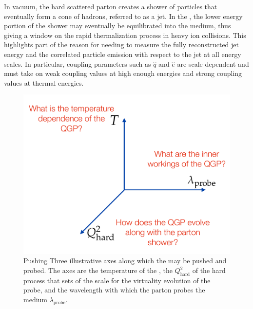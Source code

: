 
In vacuum, the hard scattered parton creates a shower of particles
that eventually form a cone of hadrons, referred to as a jet.  In the
\qgp, the lower energy portion of the shower may eventually be
equilibrated into the medium, thus giving a window on the rapid
thermalization process in heavy ion collisions.  This highlights part
of the reason for needing to measure the fully reconstructed jet
energy and the correlated particle emission with respect to the jet at
all energy scales.  In particular, coupling parameters such as
$\hat{q}$ and $\hat{e}$ are scale dependent and must take on weak
coupling values at high enough energies and strong
coupling values at thermal energies.

\begin{figure}[ht]
 \begin{center}
   \includegraphics[trim = 2 2 2 2, clip, width=\onewidth]{figs/figure_physicscase_threeaxes}
   \caption[ Pushing and probing the \qgp along three axes]{Pushing
     Three illustrative axes along which the \qgp may be pushed and
     probed.  The axes are the temperature of the \qgp, the
     $Q^2_{\mathrm{hard}}$ of the hard process that sets of the scale
     for the virtuality evolution of the probe, and the wavelength
     with which the parton probes the medium
     $\lambda_{\mathrm{probe}}$.}
   \label{fig:threeaxes}
 \end{center}
\end{figure}

